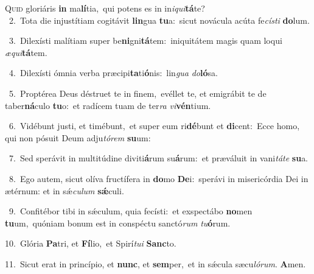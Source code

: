\lettrine{\initial\textcolor{\initialcolor}{Q}}{uid} gloriáris \textbf{in} ma\-\textbf{lí}\-tia,~\star qui potens es in in\-\textit{i}\-\textit{qui}\textbf{tá}te?\\
{\numbfont\textcolor{\numbcolor}{~2.}}~Tota die injustítiam cogitávit \textbf{lin}\-gua \textbf{tu}\-a:~\star sicut novácula acúta fe\-\textit{cís}\-\textit{ti} \textbf{do}\-lum.\par
{\numbfont\textcolor{\numbcolor}{~3.}}~Dilexísti malítiam super be\-\textbf{ni}\-gni\-\textbf{tá}\-tem:~\star iniquitátem magis quam loqui \textit{æ}\-\textit{qui}\textbf{tá}tem.\par
{\numbfont\textcolor{\numbcolor}{~4.}}~Dilexísti ómnia verba præcipi\-\textbf{ta}\-ti\-\textbf{ó}\-nis:~\star lin\textit{gua} \textit{do}\-\textbf{ló}sa.\par
{\numbfont\textcolor{\numbcolor}{~5.}}~Proptérea Deus déstruet te in finem,~\dagger evéllet te, et emigrábit te de taber\-\textbf{ná}\-culo \textbf{tu}\-o:~\star et radícem tuam de ter\textit{ra} \textit{vi}\-\textbf{vén}tium.\par
{\numbfont\textcolor{\numbcolor}{~6.}}~Vidébunt justi, et timébunt,~\dagger et super eum ri\-\textbf{dé}\-bunt et \textbf{di}\-cent:~\star Ecce homo, qui non pósuit Deum adju\-\textit{tó}\-\textit{rem} \textbf{su}\-um:\par
{\numbfont\textcolor{\numbcolor}{~7.}}~Sed sperávit in multitúdine diviti\-\textbf{á}\-rum su\-\textbf{á}\-rum:~\star et præváluit in vani\-\textit{tá}\-\textit{te} \textbf{su}\-a.\par
{\numbfont\textcolor{\numbcolor}{~8.}}~Ego autem, sicut olíva fructífera in \textbf{do}\-mo \textbf{De}\-i:~\star sperávi in misericórdia Dei in ætérnum: et in sǽ\-\textit{cu}\-\textit{lum} \textbf{sǽ}\-culi.\par
{\numbfont\textcolor{\numbcolor}{~9.}}~Confitébor tibi in sǽculum, quia fecísti:~\dagger et exspectábo \textbf{no}\-men \textbf{tu}\-um,~\star quóniam bonum est in conspéctu sanctó\textit{rum} \textit{tu}\-\textbf{ó}rum.\par
{\numbfont\textcolor{\numbcolor}{10.}}~Glória \textbf{Pa}\-tri, et \textbf{Fí}\-lio,~\star et Spirí\-\textit{tu}\-\textit{i} \textbf{Sanc}\-to.\par
{\numbfont\textcolor{\numbcolor}{11.}}~Sicut erat in princípio, et \textbf{nunc}\-, et \textbf{sem}\-per,~\star et in sǽcula sæcu\-\textit{ló}\-\textit{rum}. \textbf{A}\-men.\par
